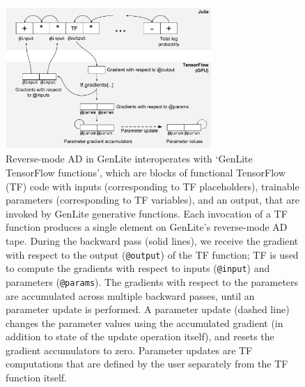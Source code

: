 \begin{figure}[h]
\centering
    \includegraphics[width=0.7\textwidth]{images/tf-integration-schematic.pdf}
    \caption{
Reverse-mode AD in GenLite interoperates with `GenLite TensorFlow functions', which are blocks of functional TensorFlow (TF) code with inputs (corresponding to TF placeholders), trainable parameters (corresponding to TF variables), and an output, that are invoked by GenLite generative functions.
Each invocation of a TF function produces a single element on GenLite's reverse-mode AD tape.
During the backward pass (solid lines), we receive the gradient with respect to the output (\texttt{@output}) of the TF function; TF is used to compute the gradients with respect to inputs (\texttt{@input}) and parameters (\texttt{@params}).
The gradients with respect to the parameters are accumulated across multiple backward passes, until an parameter update is performed.
A parameter update (dashed line) changes the parameter values using the accumulated gradient (in addition to state of the update operation itself), and resets the gradient accumulators to zero.
Parameter updates are TF computations that are defined by the user separately from the TF function itself.
}
    \label{fig:tf-integration-schematic}
\end{figure}






